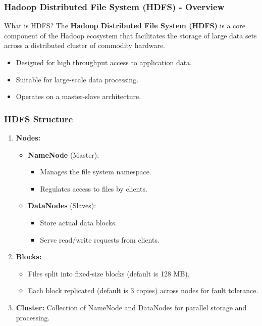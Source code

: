 \documentclass[aspectratio=169]{beamer}
\begin{document}
\begin{frame}[fragile]
    \frametitle{Hadoop Distributed File System (HDFS) - Overview}
    \begin{block}{What is HDFS?}
        The \textbf{Hadoop Distributed File System (HDFS)} is a core component of the Hadoop ecosystem that facilitates the storage of large data sets across a distributed cluster of commodity hardware.
    \end{block}
    \begin{itemize}
        \item Designed for high throughput access to application data.
        \item Suitable for large-scale data processing.
        \item Operates on a master-slave architecture.
    \end{itemize}
\end{frame}

\begin{frame}[fragile]
    \frametitle{HDFS Structure}
    \begin{enumerate}
        \item \textbf{Nodes:}
        \begin{itemize}
            \item \textbf{NameNode} (Master):
                \begin{itemize}
                    \item Manages the file system namespace.
                    \item Regulates access to files by clients.
                \end{itemize}
            \item \textbf{DataNodes} (Slaves):
                \begin{itemize}
                    \item Store actual data blocks.
                    \item Serve read/write requests from clients.
                \end{itemize}
        \end{itemize}
        \item \textbf{Blocks:}
        \begin{itemize}
            \item Files split into fixed-size blocks (default is 128 MB).
            \item Each block replicated (default is 3 copies) across nodes for fault tolerance.
        \end{itemize}
        \item \textbf{Cluster:} Collection of NameNode and DataNodes for parallel storage and processing.
    \end{enumerate}
\end{frame}
\end{document}

